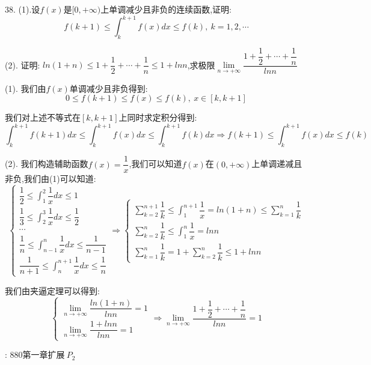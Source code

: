 38. (1).设$f(x)$是$[0,+\infty)$上单调减少且非负的连续函数,证明:  $$f(k+1)\leq \int_{k}^{k+1}f(x)dx\leq f(k),\ k=1,2,\cdots$$

(2). 证明:  $ln(1+n)\leq 1+\dfrac{1}{2}+\cdots+\dfrac{1}{n}\leq 1+ln n$,求极限$\lim\limits_{n\rightarrow+\infty}\dfrac{1+\dfrac{1}{2}+\cdots+\dfrac{1}{n}}{ln n}$
\begin{solution}
	
	(1). 我们由$f(x)$单调减少且非负得到:  
	$$0\leq f(k+1)\leq f(x)\leq f(k),\ x\in[k,k+1]$$
	
	我们对上述不等式在$[k,k+1]$上同时求定积分得到:  
	$$\int_{k}^{k+1}f(k+1)dx\leq \int_{k}^{k+1}f(x)dx\leq \int_{k}^{k+1}f(k)dx\Rightarrow f(k+1)\leq \int_{k}^{k+1}f(x)dx\leq f(k)$$
	
	(2). 我们构造辅助函数$f(x)=\dfrac{1}{x}$,我们可以知道$f(x)$在$(0,+\infty)$上单调递减且非负,我们由(1)可以知道:  
	$$\left\lbrace
	\begin{array}{l}
		\dfrac{1}{2}\leq \int_{1}^{2}\dfrac{1}{x}dx\leq 1\\
		\dfrac{1}{3}\leq \int_{2}^{3}\dfrac{1}{x}dx\leq \dfrac{1}{2}\\
		\cdots\\
		\dfrac{1}{n}\leq \int_{n-1}^{n}\dfrac{1}{x}dx\leq \dfrac{1}{n-1}\\
		\dfrac{1}{n+1}\leq \int_{n}^{n+1}\dfrac{1}{x}dx\leq \dfrac{1}{n}
	\end{array}
	\right. \Rightarrow \left\lbrace
	\begin{array}{l}
		\sum\limits_{k=2}^{n+1}\dfrac{1}{k}\leq \int_{1}^{n+1}\dfrac{1}{x}=ln(1+n)\leq \sum\limits_{k=1}^{n}\dfrac{1}{k}\\
		\sum\limits_{k=2}^{n}\dfrac{1}{k}\leq \int_{1}^{n}\dfrac{1}{x}=ln n\\
		\sum\limits_{k=1}^{n}\dfrac{1}{k}=1+\sum\limits_{k=2}^{n}\dfrac{1}{k}\leq 1+ln n
	\end{array}
	\right. $$
	
	我们由夹逼定理可以得到:  
	$$\left\lbrace
	\begin{array}{l}
		\lim\limits_{n\rightarrow +\infty}\dfrac{ln(1+n)}{ln n}=1\\
		\lim\limits_{n\rightarrow +\infty}\dfrac{1+ln n}{ln n}=1
	\end{array}
	\right. \Rightarrow \lim\limits_{n\rightarrow  +\infty}\dfrac{1+\dfrac{1}{2}+\cdots+\dfrac{1}{n}}{ln n}=1$$
\end{solution}
\begin{anymark}[注]
	[题目来源]:  $880\text{第一章扩展} \ P_{2}$
\end{anymark}

